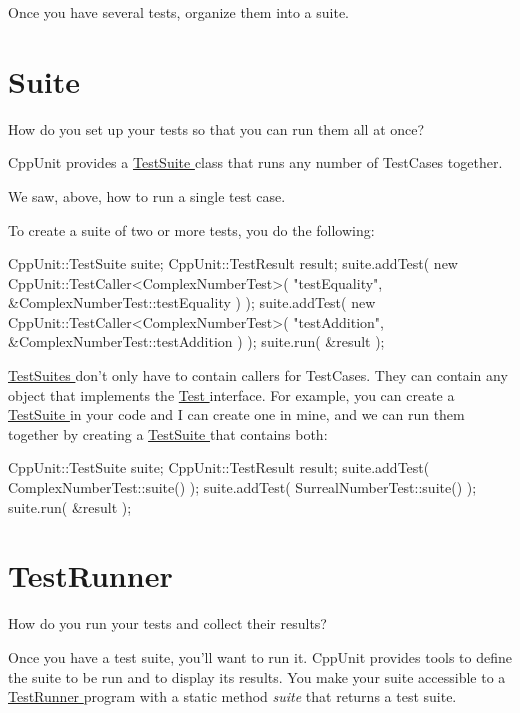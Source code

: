 Once you have several tests, organize them into a suite.\hypertarget{cppunit_cookbook_suite}{}\section{Suite}\label{cppunit_cookbook_suite}
How do you set up your tests so that you can run them all at once?

CppUnit provides a \hyperlink{}{TestSuite } class that runs any number of TestCases together.

We saw, above, how to run a single test case.

To create a suite of two or more tests, you do the following:


\begin{DoxyCode}
CppUnit::TestSuite suite;
CppUnit::TestResult result;
suite.addTest( new CppUnit::TestCaller<ComplexNumberTest>(
                       "testEquality", 
                       &ComplexNumberTest::testEquality ) );
suite.addTest( new CppUnit::TestCaller<ComplexNumberTest>(
                       "testAddition", 
                       &ComplexNumberTest::testAddition ) );
suite.run( &result );
\end{DoxyCode}


\hyperlink{}{TestSuites } don't only have to contain callers for TestCases. They can contain any object that implements the \hyperlink{}{Test } interface. For example, you can create a \hyperlink{}{TestSuite } in your code and I can create one in mine, and we can run them together by creating a \hyperlink{}{TestSuite } that contains both:


\begin{DoxyCode}
CppUnit::TestSuite suite;
CppUnit::TestResult result;
suite.addTest( ComplexNumberTest::suite() );
suite.addTest( SurrealNumberTest::suite() );
suite.run( &result );
\end{DoxyCode}
\hypertarget{cppunit_cookbook_test_runner}{}\section{TestRunner}\label{cppunit_cookbook_test_runner}
How do you run your tests and collect their results?

Once you have a test suite, you'll want to run it. CppUnit provides tools to define the suite to be run and to display its results. You make your suite accessible to a \hyperlink{group___executing_test}{TestRunner } program with a static method {\itshape suite\/} that returns a test suite.

